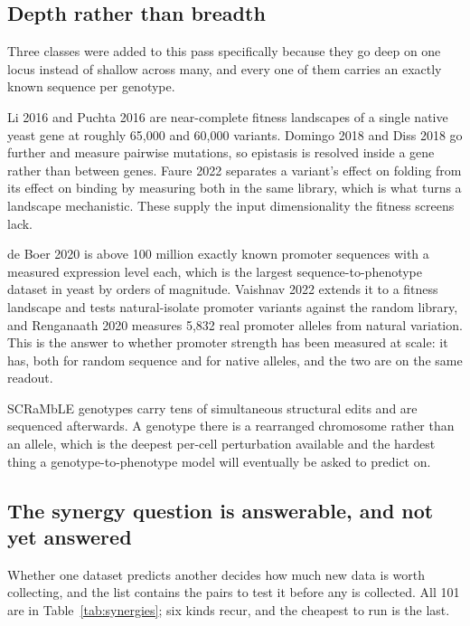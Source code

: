 \subsection{Depth rather than breadth}\label{sec:depth}

Three classes were added to this pass specifically because they go deep on one locus instead
of shallow across many, and every one of them carries an exactly known sequence per genotype.

 Li 2016 and Puchta 2016 are near-complete fitness
landscapes of a single native yeast gene at roughly 65,000 and 60,000 variants. Domingo 2018
and Diss 2018 go further and measure pairwise mutations, so epistasis is resolved inside a
gene rather than between genes. Faure 2022 separates a variant's effect on folding from its
effect on binding by measuring both in the same library, which is what turns a landscape
mechanistic. These supply the input dimensionality the fitness screens lack.

 de Boer 2020 is above 100 million exactly known promoter
sequences with a measured expression level each, which is the largest sequence-to-phenotype
dataset in yeast by orders of magnitude. Vaishnav 2022 extends it to a fitness landscape and
tests natural-isolate promoter variants against the random library, and Renganaath 2020
measures 5,832 real promoter alleles from natural variation. This is the answer to whether
promoter strength has been measured at scale: it has, both for random sequence and for
native alleles, and the two are on the same readout.

 SCRaMbLE genotypes carry tens of simultaneous
structural edits and are sequenced afterwards. A genotype there is a rearranged chromosome
rather than an allele, which is the deepest per-cell perturbation available and the hardest
thing a genotype-to-phenotype model will eventually be asked to predict on.

\subsection{The synergy question is answerable, and not yet answered}

Whether one dataset predicts another decides how much new data is worth collecting, and the
list contains the pairs to test it before any is collected. All 101 are in
Table~\ref{tab:synergies}; six kinds recur, and the cheapest to run is the last.

